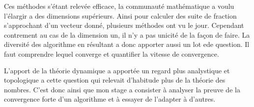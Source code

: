Ces méthodes s'étant relevée efficace, la communauté mathématique a voulu l'élargir a des dimensions supérieurs. Ainsi pour calculer des suite de fraction s'approchant d'un vecteur donné, plusieurs méthodes ont vu le jour. Cependant contrement au cas de la dimension un, il n'y a pas unicité de la façon de faire. La diversité des algorithme en résultant a donc apporter aussi un lot ede question. Il faut comprendre lequel converge et quantifier la vitesse de convergence.

L'apport de la théorie dynamique a apportée un regard plus analystique et topologique a cette question qui relevait d'habitude plus de la théorie des nombres. C'est donc ainsi que mon stage a consister à analyser la preuve de la convergence forte d'un algorithme et à essayer de l'adapter à d'autres.
